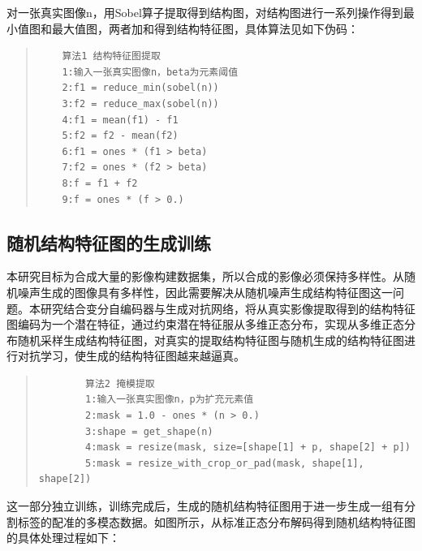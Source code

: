 \documentclass[letterpaper]{article} %
\begin{document}
对一张真实图像n，用Sobel算子提取得到结构图，对结构图进行一系列操作得到最小值图和最大值图，两者加和得到结构特征图，具体算法见如下伪码：
\begin{quote}
	\begin{scriptsize}\begin{verbatim}
	算法1 结构特征图提取
	1:输入一张真实图像n，beta为元素阈值
	2:f1 = reduce_min(sobel(n))
	3:f2 = reduce_max(sobel(n))
	4:f1 = mean(f1) - f1
	5:f2 = f2 - mean(f2)
	6:f1 = ones * (f1 > beta)
	7:f2 = ones * (f2 > beta)
	8:f = f1 + f2
	9:f = ones * (f > 0.)
	\end{verbatim}\end{scriptsize}
\end{quote}

\subsection{随机结构特征图的生成训练}
本研究目标为合成大量的影像构建数据集，所以合成的影像必须保持多样性。从随机噪声生成的图像具有多样性，因此需要解决从随机噪声生成结构特征图这一问题。本研究结合变分自编码器与生成对抗网络，将从真实影像提取得到的结构特征图编码为一个潜在特征，通过约束潜在特征服从多维正态分布，实现从多维正态分布随机采样生成结构特征图，对真实的提取结构特征图与随机生成的结构特征图进行对抗学习，使生成的结构特征图越来越逼真。
\begin{quote}
	\begin{scriptsize}\begin{verbatim}
		算法2 掩模提取
		1:输入一张真实图像n，p为扩充元素值
		2:mask = 1.0 - ones * (n > 0.)
		3:shape = get_shape(n)
		4:mask = resize(mask, size=[shape[1] + p, shape[2] + p])
		5:mask = resize_with_crop_or_pad(mask, shape[1], shape[2])
		\end{verbatim}\end{scriptsize}
\end{quote}
这一部分独立训练，训练完成后，生成的随机结构特征图用于进一步生成一组有分割标签的配准的多模态数据。如图所示，从标准正态分布解码得到随机结构特征图的具体处理过程如下：
\end{document}
